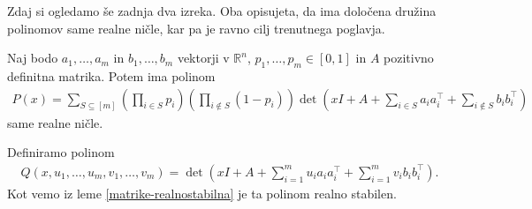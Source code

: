 Zdaj si ogledamo še zadnja dva izreka. Oba opisujeta, da ima določena družina polinomov same realne ničle, kar pa je ravno cilj trenutnega poglavja.
\begin{izrek}\label{realne-nicle-velik-polinom-1}
    Naj bodo \(a_1, \ldots, a_m\) in \(b_1, \ldots, b_m\) vektorji v \(\mathbb R^n\), \(p_1,\ldots, p_m \in [0,1]\) in \(A\) pozitivno definitna matrika. Potem ima polinom
    \begin{align*}
        P(x) = \sum_{S\subseteq [m]} \left(\prod_{i\in S} p_i\right)\left(\prod_{i\notin S} \left(1-p_i\right)\right) \det\left(xI + A + \sum_{i\in S} a_i a_i^\top + \sum_{i\notin S} b_i b_i^\top\right)
    \end{align*}
    same realne ničle.
\end{izrek}
\begin{dokaz}
    Definiramo polinom
    \begin{align*}
        Q(x, u_1, \ldots, u_m, v_1, \ldots, v_m) = \det\left(xI + A + \sum_{i=1}^m u_i a_i a_i^\top + \sum_{i=1}^m v_i b_i b_i^\top\right).
    \end{align*}
    Kot vemo iz leme \ref{matrike-realnostabilna} je ta polinom realno stabilen.


\end{dokaz}
